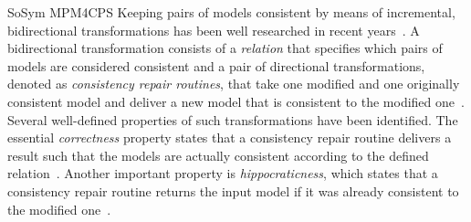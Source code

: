 \begin{copiedFrom}{SoSym MPM4CPS}
Keeping pairs of models consistent by means of incremental, bidirectional transformations has been well researched in recent years~\cite{stevens2010sosym, etzlstorfer2013a, cleve2019dagstuhl}.
A bidirectional transformation consists of a \emph{relation} that specifies which pairs of models are considered consistent and a pair of directional transformations, denoted as \emph{consistency repair routines}, that take one modified and one originally consistent model and deliver a new model that is consistent to the modified one~\cite{stevens2010sosym}.
Several well-defined properties of such transformations have been identified.
The essential \emph{correctness} property states that a consistency repair routine delivers a result such that the models are actually consistent according to the defined relation~\cite{stevens2010sosym}.
Another important property is \emph{hippocraticness}, which states that a consistency repair routine returns the input model if it was already consistent to the modified one~\cite{stevens2010sosym}.


\end{copiedFrom}
